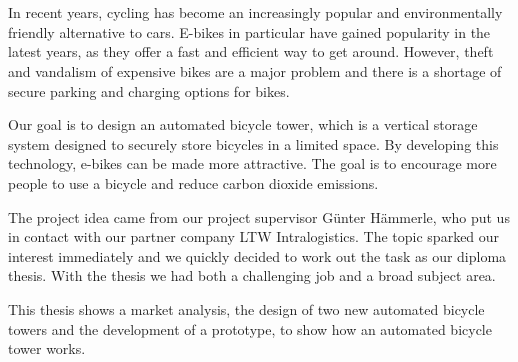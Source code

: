 \section*{}
In recent years, cycling has become an increasingly popular and environmentally friendly alternative to cars. E-bikes in particular have gained popularity in the latest years, as they offer a fast and efficient way to get around. However, theft and vandalism of expensive bikes are a major problem and there is a shortage of secure parking and charging options for bikes.

\smallskip \noindent Our goal is to design an automated bicycle tower, which is a vertical storage system designed to securely store bicycles in a limited space. By developing this technology, e-bikes can be made more attractive. The goal is to encourage more people to use a bicycle and reduce carbon dioxide emissions.

\smallskip \noindent The project idea came from our project supervisor Günter Hämmerle, who put us in contact with our partner company LTW Intralogistics. The topic sparked our interest immediately and we quickly decided to work out the task as our diploma thesis. With the thesis we had both a challenging job and a broad subject area.

\smallskip \noindent This thesis shows a market analysis, the design of two new automated bicycle towers and the development of a prototype, to show how an automated bicycle tower works.
